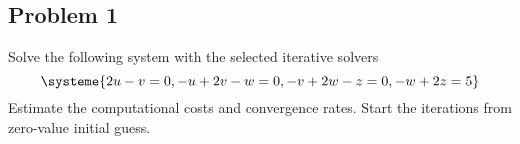 \subsection{Problem 1}%
\label{sec:problem_1}
Solve the following system with the selected iterative solvers
\begin{equation*}
  \systeme{2u-v=0,-u+2v-w=0,-v+2w-z=0,-w+2z=5}
\end{equation*}
Estimate the computational costs and convergence rates.
Start the iterations from zero-value initial guess.
